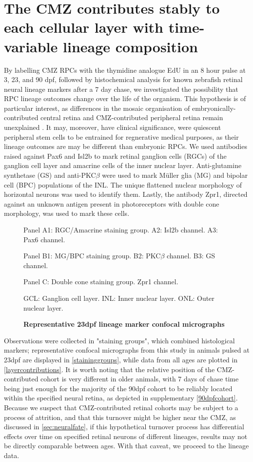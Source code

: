 \section{The CMZ contributes stably to each cellular layer with time-variable lineage composition}

By labelling CMZ RPCs with the thymidine analogue EdU in an 8 hour pulse at 3, 23, and 90 dpf, followed by histochemical analysis for known zebrafish retinal neural lineage markers after a 7 day chase, we investigated the possibility that RPC lineage outcomes change over the life of the organism. This hypothesis is of particular interest, as differences in the mosaic organisation of embryonically-contributed central retina and CMZ-contributed peripheral retina remain unexplained \cite{Allison2010}. It may, moreover, have clinical significance, were quiescent peripheral stem cells to be entrained for regnerative medical purposes, as their lineage outcomes are may be different than embryonic RPCs.  We used antibodies raised against Pax6 and Isl2b to mark retinal ganglion cells (RGCs) of the ganglion cell layer and amacrine cells of the inner nuclear layer. Anti-glutamine synthetase (GS) and anti-PKC$\beta$ were used to mark M\"{u}ller glia (MG) and bipolar cell (BPC) populations of the INL. The unique flattened nuclear morphology of horizontal neurons was used to identify them. Lastly, the antibody Zpr1, directed against an unknown antigen present in photoreceptors with double cone morphology, was used to mark these cells.

\begin{figure}[!h]
    \caption{{\bf Representative 23dpf lineage marker confocal micrographs}}
    Panel A1: RGC/Amacrine staining group. A2: Isl2b channel. A3: Pax6 channel.

    Panel B1: MG/BPC staining group. B2: PKC$\beta$ channel. B3: GS channel.

    Panel C: Double cone staining group. Zpr1 channel.

    GCL: Ganglion cell layer. INL: Inner nuclear layer. ONL: Outer nuclear layer.
    \label{staininggroups}
\end{figure}

Observations were collected in "staining groups", which combined histological markers; representative confocal micrographs from this study in animals pulsed at 23dpf are displayed in \autoref{staininggroups}, while data from all ages are plotted in \autoref{layercontributions}. It is worth noting that the relative position of the CMZ-contributed cohort is very different in older animals, with 7 days of chase time being just enough for the majority of the 90dpf cohort to be reliably located within the specified neural retina, as depicted in supplementary \autoref{90dpfcohort}. Because we suspect that CMZ-contributed retinal cohorts may be subject to a process of attrition, and that this turnover might be higher near the CMZ, as discussed in \autoref{sec:neuralfate}, if this hypothetical turnover process has differential effects over time on specified retinal neurons of different lineages, results may not be directly comparable between ages. With that caveat, we proceed to the lineage data.

